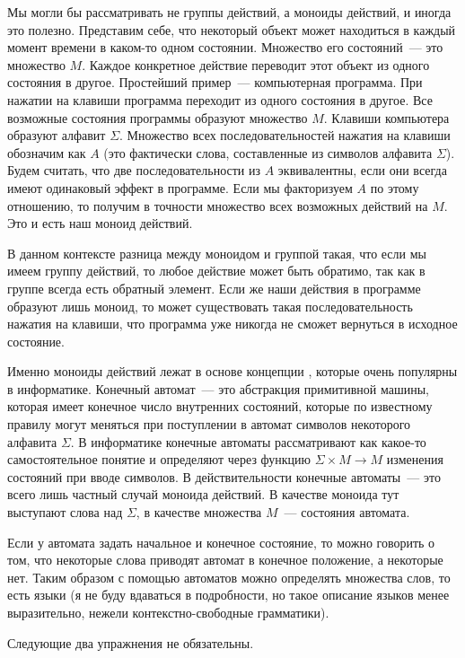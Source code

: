 Мы могли бы рассматривать не группы действий, а моноиды действий, и иногда это полезно. Представим себе, что некоторый объект может находиться в каждый момент времени в каком-то одном состоянии. Множество его состояний~--- это множество $M$. Каждое конкретное действие переводит этот объект из одного состояния в другое. Простейший пример~--- компьютерная программа. При нажатии на клавиши программа переходит из одного состояния в другое. Все возможные состояния программы образуют множество $M$. Клавиши компьютера образуют алфавит $\Sigma$. Множество всех последовательностей нажатия на клавиши обозначим как $A$ (это фактически слова, составленные из символов алфавита $\Sigma$). Будем считать, что две последовательности из $A$ эквивалентны, если они всегда имеют одинаковый эффект в программе. Если мы факторизуем $A$ по этому отношению, то получим в точности множество всех возможных действий на $M$. Это и есть наш моноид действий.

В данном контексте разница между моноидом и группой такая, что если мы имеем группу действий, то любое действие может быть обратимо, так как в группе всегда есть обратный элемент. Если же наши действия в программе образуют лишь моноид, то может существовать такая последовательность нажатия на клавиши, что программа уже никогда не сможет вернуться в исходное состояние.

Именно моноиды действий лежат в основе концепции , которые очень популярны в информатике. Конечный автомат~--- это абстракция примитивной машины, которая имеет конечное число внутренних состояний, которые по известному правилу могут меняться при поступлении в автомат символов некоторого алфавита $\Sigma$. В информатике конечные автоматы рассматривают как какое-то самостоятельное понятие и определяют через функцию $\Sigma\times M\to M$ изменения состояний при вводе символов. В действительности конечные автоматы~--- это всего лишь частный случай моноида действий. В качестве моноида тут выступают слова над $\Sigma$, в качестве множества $M$~--- состояния автомата.

Если у автомата задать начальное и конечное состояние, то можно говорить о том, что некоторые слова приводят автомат в конечное положение, а некоторые нет. Таким образом с помощью автоматов можно определять множества слов, то есть языки (я не буду вдаваться в подробности, но такое описание языков менее выразительно, нежели контекстно-свободные грамматики).

Следующие два упражнения не обязательны.

